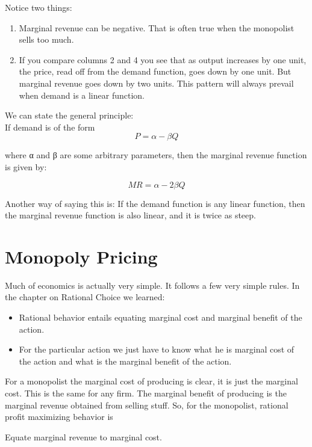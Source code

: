 \documentclass[
]{book}
\providecommand{\tightlist}{%
  \setlength{\itemsep}{0pt}\setlength{\parskip}{0pt}}
\begin{document}
Notice two things:

\begin{enumerate}
\def\labelenumi{\arabic{enumi}.}
\tightlist
\item
  Marginal revenue can be negative. That is often true when the monopolist sells too much.
\item
  If you compare columns 2 and 4 you see that as output increases by one unit, the price, read off from the demand function, goes down by one unit. But marginal revenue goes down by two units. This pattern will always prevail when demand is a linear function.
\end{enumerate}

We can state the general principle:\\
If demand is of the form\\
\[ P=\alpha-\beta Q\]

where α and β are some arbitrary parameters, then the marginal revenue function is given by:

\[MR = \alpha - 2 \beta Q\]

Another way of saying this is: If the demand function is any linear function, then the marginal revenue function is also linear, and it is twice as steep.

\hypertarget{monopoly-pricing}{%
\section{Monopoly Pricing}\label{monopoly-pricing}}

Much of economics is actually very simple. It follows a few very simple rules. In the chapter on Rational Choice we learned:

\begin{itemize}
\tightlist
\item
  Rational behavior entails equating marginal cost and marginal benefit of the action.
\item
  For the particular action we just have to know what he is marginal cost of the action and what is the marginal benefit of the action.
\end{itemize}

For a monopolist the marginal cost of producing is clear, it is just the marginal cost. This is the same for any firm. The marginal benefit of producing is the marginal revenue obtained from selling stuff. So, for the monopolist, rational profit maximizing behavior is

\begin{center}
Equate marginal revenue to marginal cost.

\end{center}
\end{document}
